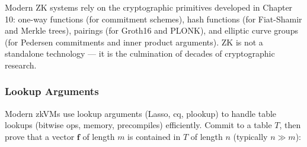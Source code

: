 Modern ZK systems rely on the cryptographic primitives developed in Chapter 10: one-way functions (for commitment schemes), hash functions (for Fiat-Shamir and Merkle trees), pairings (for Groth16 and PLONK), and elliptic curve groups (for Pedersen commitments and inner product arguments). ZK is not a standalone technology --- it is the culmination of decades of cryptographic research.

\subsubsection*{Lookup Arguments}
\label{sec:zk:lookup}

Modern zkVMs use lookup arguments (Lasso, cq, plookup) to handle table lookups (bitwise ops, memory, precompiles) efficiently. Commit to a table $T$, then prove that a vector $\mathbf{f}$ of length $m$ is contained in $T$ of length $n$ (typically $n \gg m$):

